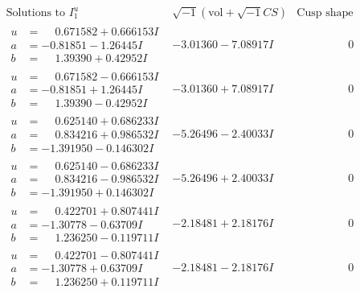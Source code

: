 \documentclass[1p]{elsarticle_modified}
\theoremstyle{definition}
\newcommand{\I}{\sqrt{-1}}
\begin{document}
$$\begin{array}{c|c|c}  
\text{Solutions to }I^u_{1}& \I (\text{vol} + \sqrt{-1}CS) & \text{Cusp shape}\\
 \hline 
\begin{aligned}
u &= \phantom{-}0.671582 + 0.666153 I \\
a &= -0.81851 - 1.26445 I \\
b &= \phantom{-}1.39390 + 0.42952 I\end{aligned}
 & -3.01360 - 7.08917 I & \phantom{-0.000000 } 0 \\ \hline\begin{aligned}
u &= \phantom{-}0.671582 - 0.666153 I \\
a &= -0.81851 + 1.26445 I \\
b &= \phantom{-}1.39390 - 0.42952 I\end{aligned}
 & -3.01360 + 7.08917 I & \phantom{-0.000000 } 0 \\ \hline\begin{aligned}
u &= \phantom{-}0.625140 + 0.686233 I \\
a &= \phantom{-}0.834216 + 0.986532 I \\
b &= -1.391950 - 0.146302 I\end{aligned}
 & -5.26496 - 2.40033 I & \phantom{-0.000000 } 0 \\ \hline\begin{aligned}
u &= \phantom{-}0.625140 - 0.686233 I \\
a &= \phantom{-}0.834216 - 0.986532 I \\
b &= -1.391950 + 0.146302 I\end{aligned}
 & -5.26496 + 2.40033 I & \phantom{-0.000000 } 0 \\ \hline\begin{aligned}
u &= \phantom{-}0.422701 + 0.807441 I \\
a &= -1.30778 - 0.63709 I \\
b &= \phantom{-}1.236250 - 0.119711 I\end{aligned}
 & -2.18481 + 2.18176 I & \phantom{-0.000000 } 0 \\ \hline\begin{aligned}
u &= \phantom{-}0.422701 - 0.807441 I \\
a &= -1.30778 + 0.63709 I \\
b &= \phantom{-}1.236250 + 0.119711 I\end{aligned}
 & -2.18481 - 2.18176 I & \phantom{-0.000000 } 0 \\ \hline\begin{aligned}

\end{aligned}
\end{array}$$
\end{document}
